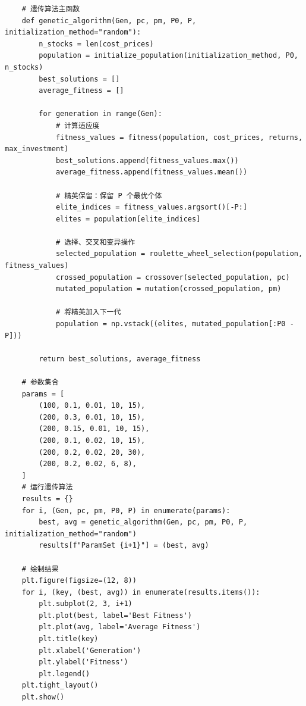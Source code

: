\documentclass[journal,twoside,web]{ieeecolor}
\begin{document}
\begin{lstlisting}
    # 遗传算法主函数
    def genetic_algorithm(Gen, pc, pm, P0, P, initialization_method="random"):
        n_stocks = len(cost_prices)
        population = initialize_population(initialization_method, P0, n_stocks)
        best_solutions = []
        average_fitness = []
    
        for generation in range(Gen):
            # 计算适应度
            fitness_values = fitness(population, cost_prices, returns, max_investment)
            best_solutions.append(fitness_values.max())
            average_fitness.append(fitness_values.mean())
    
            # 精英保留：保留 P 个最优个体
            elite_indices = fitness_values.argsort()[-P:]
            elites = population[elite_indices]
    
            # 选择、交叉和变异操作
            selected_population = roulette_wheel_selection(population, fitness_values)
            crossed_population = crossover(selected_population, pc)
            mutated_population = mutation(crossed_population, pm)
    
            # 将精英加入下一代
            population = np.vstack((elites, mutated_population[:P0 - P]))
    
        return best_solutions, average_fitness
    
    # 参数集合
    params = [
        (100, 0.1, 0.01, 10, 15),
        (200, 0.3, 0.01, 10, 15),
        (200, 0.15, 0.01, 10, 15),
        (200, 0.1, 0.02, 10, 15),
        (200, 0.2, 0.02, 20, 30),
        (200, 0.2, 0.02, 6, 8),
    ]
    # 运行遗传算法
    results = {}
    for i, (Gen, pc, pm, P0, P) in enumerate(params):
        best, avg = genetic_algorithm(Gen, pc, pm, P0, P, initialization_method="random")
        results[f"ParamSet {i+1}"] = (best, avg)
    
    # 绘制结果
    plt.figure(figsize=(12, 8))
    for i, (key, (best, avg)) in enumerate(results.items()):
        plt.subplot(2, 3, i+1)
        plt.plot(best, label='Best Fitness')
        plt.plot(avg, label='Average Fitness')
        plt.title(key)
        plt.xlabel('Generation')
        plt.ylabel('Fitness')
        plt.legend()
    plt.tight_layout()
    plt.show()
    
\end{lstlisting}
\end{document}
